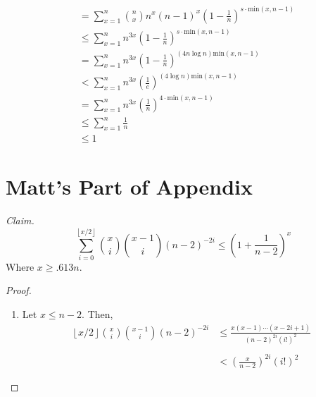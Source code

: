 \documentclass[12pt, a4paper]{article}
\begin{document}
	\begin{align*}
	&=\sum_{x=1}^n \binom{n}{x}n^x(n-1)^x
	\left(1-\frac{1}{n}\right)^{s\cdot{\text{min}(x,n-1)}} \\
	&\le \sum_{x=1}^n n^{3x} \left(1-\frac{1}{n}\right)^{s\cdot{\text{min}(x,n-1)}} \\
	&= \sum_{x=1}^n n^{3x}\left(1-\frac{1}{n}\right)^{(4n\log n){\text{min}(x,n-1)}} \\
	&< \sum_{x=1}^n n^{3x} \left(\frac{1}{e}\right)^{(4\log n){\text{min}(x,n-1)}} \\
	&= \sum_{x=1}^n n^{3x} \left(\frac{1}{n}\right)^{4\cdot{\text{min}(x,n-1)}} \\
	&\le \sum_{x=1}^n \frac{1}{n} \\
	&\le 1
	\end{align*}
	
\clearpage
\section*{Matt's Part of Appendix}
\textit{Claim.}
	\begin{equation*}
	\sum_{i=0}^{\left\lfloor x/2\right\rfloor}\binom{x}{i}\binom{x-1}{i}(n-2)^{-2i}
	\le \left(1+\frac{1}{n-2}\right)^x
	\end{equation*}
	Where $x\ge .613n$.
\begin{proof}
	\begin{enumerate}[label=\roman*.]
	\item Let $x\le n-2$. Then, 
		\begin{align*}
		\left\lfloor x/2\right\rfloor\binom{x}{i}\binom{x-1}{i}(n-2)^{-2i}
		& \le \frac{x(x-1)\cdots(x-2i+1)}{(n-2)^{2i}(i!)^2}\\\\
		& < \left(\frac{x}{n-2}\right)^{2i}(i!)^2
		\end{align*}
	
	\end{enumerate}
\end{proof}
\end{document}
